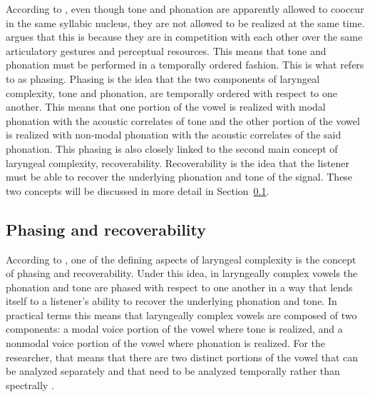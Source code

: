 According to \citet{silvermanLaryngealComplexityOtomanguean1997,silvermanPhasingRecoverability1997}, even though tone and phonation are apparently allowed to cooccur in the same syllabic nucleus, they are not allowed to be realized at the same time. \citeauthor{silvermanLaryngealComplexityOtomanguean1997} argues that this is because they are in competition with each other over the same articulatory gestures and perceptual resources. This means that tone and phonation must be performed in a temporally ordered fashion. This is what \citeauthor{silvermanLaryngealComplexityOtomanguean1997} refers to as phasing. Phasing is the idea that the two components of laryngeal complexity, tone and phonation, are temporally ordered with respect to one another. This means that one portion of the vowel is realized with modal phonation with the acoustic correlates of tone and the other portion of the vowel is realized with non-modal phonation with the acoustic correlates of the said phonation. This phasing is also closely linked to the second main concept of laryngeal complexity, recoverability. Recoverability is the idea that the listener must be able to recover the underlying phonation and tone of the signal. These two concepts will be discussed in more detail in Section~\ref{sec:phasing_and_recoverability}.

\subsection{Phasing and recoverability}\label{sec:phasing_and_recoverability}

According to \citet{silvermanLaryngealComplexityOtomanguean1997,silvermanPhasingRecoverability1997}, one of the defining aspects of laryngeal complexity is the concept of phasing and recoverability. Under this idea, in laryngeally complex vowels the phonation and tone are phased with respect to one another in a way that lends itself to a listener's ability to recover the underlying phonation and tone. In practical terms this means that laryngeally complex vowels are composed of two components: a modal voice portion of the vowel where tone is realized, and a nonmodal voice portion of the vowel where phonation is realized. For the researcher, that means that there are two distinct portions of the vowel that can be analyzed separately and that need to be analyzed temporally rather than spectrally \citep[237]{silvermanLaryngealComplexityOtomanguean1997}.


